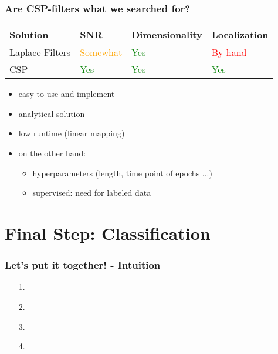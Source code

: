 \documentclass{beamer}
\begin{document}
\begin{frame}
\frametitle{Are CSP-filters what we searched for?}
	\begin{center}
    \begin{tabular}{ | l | l | l | p{3cm} |}
    \hline
   	Solution & SNR & Dimensionality & Localization \\ \hline
    Laplace Filters & \textcolor{orange}{Somewhat} & \textcolor{green}{Yes} & \textcolor{red}{By hand} \\ \hline
    CSP & \textcolor{green}{Yes} & \textcolor{green}{Yes} & \textcolor{green}{Yes} \\ \hline
    \end{tabular}
\end{center}
	\begin{itemize}
	\item easy to use and implement
	\item analytical solution
	\item low runtime (linear mapping)
	\item on the other hand:
	\begin{itemize}
	\item hyperparameters (length, time point of epochs ...)
	\item supervised: need for labeled data
	\end{itemize}
	\end{itemize}

\end{frame}

\section{Final Step: Classification}

\begin{frame}
\frametitle{Let's put it together! - Intuition}

\begin{itemize}
	\item[1.]
	\item[2.]
	\item[3.]
	\item[4.]
\end{itemize}
\centering
\end{frame}
\end{document}
